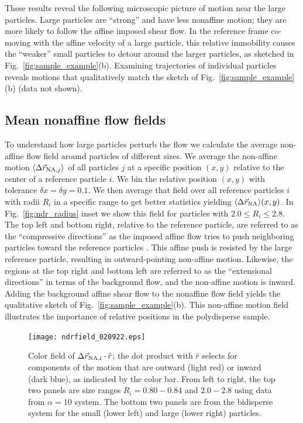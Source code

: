 \documentclass[%
 reprint,
 amsmath,amssymb,
 aps,
]{revtex4-2}
\begin{document}
These results reveal the following microscopic picture of motion near the large particles.  Large particles are ``strong'' and have less nonaffine motion; they are more likely to follow the affine imposed shear flow.  In the reference frame co-moving with the affine velocity of a large particle, this relative immobility causes the ``weaker'' small particles to detour around the larger particles, as sketched in Fig.~\ref{fig:sample_example}(b).  Examining trajectories of individual particles reveals motions that qualitatively match the sketch of Fig.~\ref{fig:sample_example}(b) (data not shown).

\subsection{Mean nonaffine flow fields}

To understand how large particles perturb the flow we calculate the average non-affine flow field around particles of different sizes. We average the non-affine motion $\langle \Delta \vec{r}_{{\rm NA},j} \rangle$ of all particles $j$ at a specific position $(x,y)$ relative to the center of a reference particle $i$. We bin the relative position $(x,y)$ with tolerance $\delta x = \delta y = 0.1$. We then average that field over all reference particles $i$ with radii $R_i$ in a specific range to get better statistics yielding $\langle \Delta \vec{r}_{{\rm NA}}\rangle(x,y)$.  In Fig.~\ref{fig:ndr_radius} inset we show this field for particles with $2.0 \leq {R}_i \leq 2.8$.  The top left and bottom right, relative to the reference particle, are referred to as the ``compressive directions'' as the imposed affine flow tries to push neighboring particles toward the reference particles \cite{batchelor_determination_1972,bergenholtz02}.  This affine push is resisted by the large reference particle, resulting in outward-pointing non-affine motion.  Likewise, the regions at the top right and bottom left are referred to as the ``extensional directions'' in terms of the background flow, and the non-affine motion is inward.  Adding the background affine shear flow to the nonaffine flow field yields the qualitative sketch of Fig.~\ref{fig:sample_example}(b).  This non-affine motion field illustrates the importance of relative positions in the polydisperse sample.

\begin{figure}
    \centering
    \texttt{[image: ndrfield\_020922.eps]}
    \caption{Color field of $\Delta \vec{r}_{\rm NA,i} \cdot \hat{r}$; the dot product with $\hat{r}$ selects for components of the motion that are outward (light red) or inward (dark blue), as indicated by the color bar. From left to right, the top two panels are size ranges $R_i = 0.80-0.84$ and $2.0-2.8$ using data from $\alpha=10$ system. The bottom two panels are from the bidisperse system for the small (lower left) and large (lower right) particles.}
    \label{fig:ndr_field}
    \vspace*{-20pt}
\end{figure}
\end{document}
